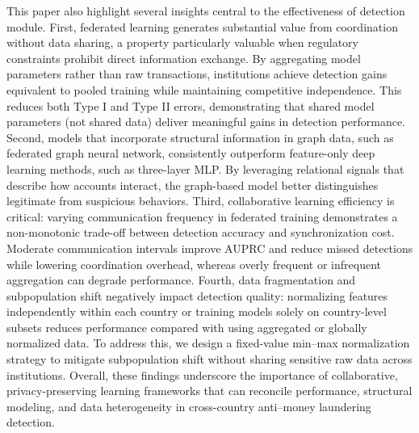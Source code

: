 \documentclass[11pt,english]{article}
\begin{document}
This paper also highlight several insights central to the effectiveness of detection module. First, federated learning generates substantial value from coordination without data sharing, a property particularly valuable when regulatory constraints prohibit direct information exchange. By aggregating model parameters rather than raw transactions, institutions achieve detection gains equivalent to pooled training while maintaining competitive independence. This reduces both Type I and Type II errors, demonstrating that shared model parameters (not shared data) deliver meaningful gains in detection performance. Second, models that incorporate structural information in graph data, such as federated graph neural network, consistently outperform feature-only deep learning methods, such as three-layer MLP. By leveraging relational signals that describe how accounts interact, the graph-based model better distinguishes legitimate from suspicious behaviors. 
Third, collaborative learning efficiency is critical: varying communication frequency in federated training demonstrates a non-monotonic trade-off between detection accuracy and synchronization cost. Moderate communication intervals improve AUPRC and reduce missed detections while lowering coordination overhead, whereas overly frequent or infrequent aggregation can degrade performance. 
Fourth, data fragmentation and subpopulation shift negatively impact detection quality: normalizing features independently within each country or training models solely on country-level subsets reduces performance compared with using aggregated or globally normalized data. To address this, we design a fixed-value min–max normalization strategy to mitigate subpopulation shift without sharing sensitive raw data across institutions. Overall, these findings underscore the importance of collaborative, privacy-preserving learning frameworks that can reconcile performance, structural modeling, and data heterogeneity in cross-country anti–money laundering detection.
\end{document}
